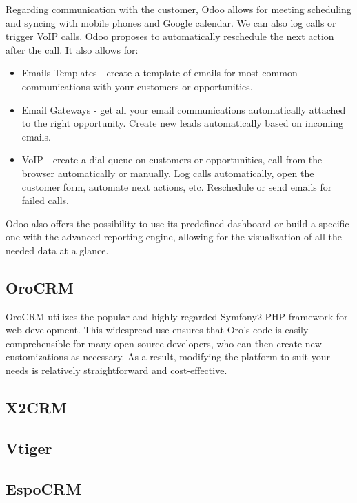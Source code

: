 \documentclass{article}
\begin{document}
Regarding communication with the customer, Odoo allows for meeting scheduling and syncing with mobile phones and Google calendar. We can also log calls or trigger VoIP calls. Odoo proposes to automatically reschedule the next action after the call. It also allows for:

\begin{itemize}
    \item Emails Templates - create a template of emails for most common communications with your customers or opportunities.
    \item Email Gateways - get all your email communications automatically attached to the right opportunity. Create new leads automatically based on incoming emails.
    \item VoIP - create a dial queue on customers or opportunities, call from the browser automatically or manually. Log calls automatically, open the customer form, automate next actions, etc. Reschedule or send emails for failed calls.
\end{itemize}

Odoo also offers the possibility to use its predefined dashboard or build a specific one with the advanced reporting engine, allowing for the visualization of all the needed data at a glance.

\subsection{OroCRM}

OroCRM utilizes the popular and highly regarded Symfony2 PHP framework for web development. This widespread use ensures that Oro's code is easily comprehensible for many open-source developers, who can then create new customizations as necessary. As a result, modifying the platform to suit your needs is relatively straightforward and cost-effective.



\subsection{X2CRM}

\subsection{Vtiger}

\subsection{EspoCRM}
\end{document}
